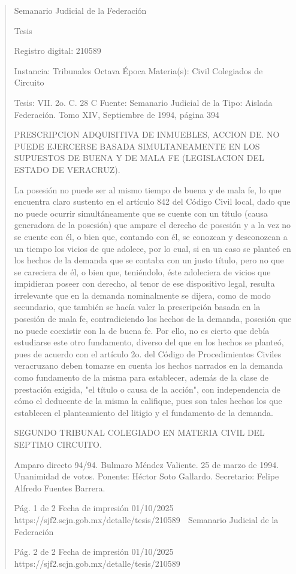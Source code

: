 \documentclass[11pt,a4paper]{article}
\begin{document}
\begin{quote}
                                                   Semanario Judicial de la Federación

                                                  Tesis

 Registro digital: 210589

 Instancia: Tribunales            Octava Época                          Materia(s): Civil
 Colegiados de Circuito

 Tesis: VII. 2o. C. 28 C          Fuente: Semanario Judicial de la      Tipo: Aislada
                                  Federación.
                                  Tomo XIV, Septiembre de 1994,
                                  página 394


PRESCRIPCION ADQUISITIVA DE INMUEBLES, ACCION DE. NO PUEDE EJERCERSE BASADA
SIMULTANEAMENTE EN LOS SUPUESTOS DE BUENA Y DE MALA FE (LEGISLACION DEL
ESTADO DE VERACRUZ).


La posesión no puede ser al mismo tiempo de buena y de mala fe, lo que encuentra claro sustento
en el artículo 842 del Código Civil local, dado que no puede ocurrir simultáneamente que se cuente
con un título (causa generadora de la posesión) que ampare el derecho de posesión y a la vez no
se cuente con él, o bien que, contando con él, se conozcan y desconozcan a un tiempo los vicios de
que adolece, por lo cual, si en un caso se planteó en los hechos de la demanda que se contaba con
un justo título, pero no que se careciera de él, o bien que, teniéndolo, éste adoleciera de vicios que
impidieran poseer con derecho, al tenor de ese dispositivo legal, resulta irrelevante que en la
demanda nominalmente se dijera, como de modo secundario, que también se hacía valer la
prescripción basada en la posesión de mala fe, contradiciendo los hechos de la demanda, posesión
que no puede coexistir con la de buena fe. Por ello, no es cierto que debía estudiarse este otro
fundamento, diverso del que en los hechos se planteó, pues de acuerdo con el artículo 2o. del
Código de Procedimientos Civiles veracruzano deben tomarse en cuenta los hechos narrados en la
demanda como fundamento de la misma para establecer, además de la clase de prestación exigida,
"el título o causa de la acción", con independencia de cómo el deducente de la misma la califique,
pues son tales hechos los que establecen el planteamiento del litigio y el fundamento de la
demanda.

SEGUNDO TRIBUNAL COLEGIADO EN MATERIA CIVIL DEL SEPTIMO CIRCUITO.


Amparo directo 94/94. Bulmaro Méndez Valiente. 25 de marzo de 1994. Unanimidad de votos.
Ponente: Héctor Soto Gallardo. Secretario: Felipe Alfredo Fuentes Barrera.




                                             Pág. 1 de 2             Fecha de impresión 01/10/2025
  https://sjf2.scjn.gob.mx/detalle/tesis/210589
                                                Semanario Judicial de la Federación




                                           Pág. 2 de 2       Fecha de impresión 01/10/2025
https://sjf2.scjn.gob.mx/detalle/tesis/210589

\end{quote}
\end{document}
